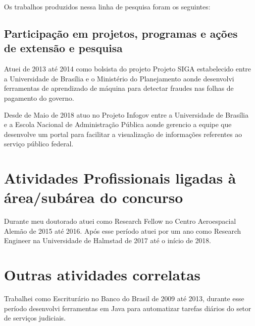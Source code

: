 \documentclass[12pt]{article}
\begin{document}
Os trabalhos produzidos nessa linha de pesquisa foram os seguintes:

\subsection{Participação em projetos, programas e
ações de extensão e pesquisa}

Atuei de 2013 até 2014 como bolsista do projeto Projeto SIGA estabelecido entre a Universidade de Brasília e o Ministério do Planejamento aonde desenvolvi ferramentas de aprendizado de máquina para detectar fraudes nas folhas de pagamento do governo.

Desde de Maio de 2018 atuo no Projeto Infogov entre a Universidade de Brasília e a Escola Nacional de Administração Pública aonde gerencio a equipe que desenvolve um portal para facilitar a visualização de informações referentes ao serviço público federal.

\section{Atividades Profissionais ligadas à área/subárea do concurso}

Durante meu doutorado atuei como Research Fellow no Centro Aeroespacial Alemão de 2015 até 2016. Após esse período atuei por um ano como Research Engineer na Universidade de Halmstad de 2017 até o início de 2018.

\section{Outras atividades correlatas}

Trabalhei como Escriturário no Banco do Brasil de 2009 até 2013, durante esse período desenvolvi ferramentas em Java para automatizar tarefas diários do setor de serviços judiciais.




\newpage
{}



\end{document}
